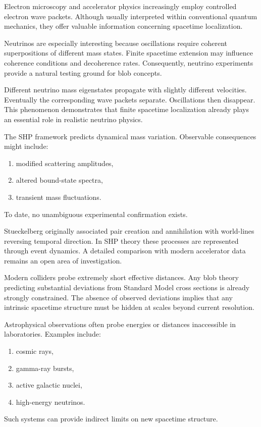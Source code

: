 Electron microscopy and accelerator physics increasingly employ controlled electron wave packets.
Although usually interpreted within conventional quantum mechanics, they
offer valuable information concerning spacetime localization.

Neutrinos are especially interesting because oscillations require coherent
superpositions of different mass states.
Finite spacetime extension may influence coherence conditions and 
decoherence rates.
Consequently, neutrino experiments provide a natural testing ground for
blob concepts.

Different neutrino mass eigenstates propagate with slightly different
velocities.
Eventually the corresponding wave packets separate.
Oscillations then disappear.
This phenomenon demonstrates that finite spacetime localization already 
plays an essential role in realistic neutrino physics.

The SHP framework predicts dynamical mass variation.
Observable consequences might include:
\begin{enumerate}
\item modified scattering amplitudes,
\item altered bound-state spectra,
\item transient mass fluctuations.
\end{enumerate}
To date, no unambiguous experimental confirmation exists.

Stueckelberg originally associated pair creation and annihilation with
world-lines reversing temporal direction.
In SHP theory these processes are represented through event dynamics.
A detailed comparison with modern accelerator data remains an open area of investigation.

Modern colliders probe extremely short effective distances.
Any blob theory predicting substantial deviations from Standard Model 
cross sections is already strongly constrained.
The absence of observed deviations implies that any intrinsic spacetime
structure must be hidden at scales beyond current resolution.

Astrophysical observations often probe energies or distances inaccessible 
in laboratories.
Examples include:
\begin{enumerate}
\item cosmic rays,
\item gamma-ray bursts,
\item active galactic nuclei,
\item high-energy neutrinos.
\end{enumerate}
Such systems can provide indirect limits on new spacetime structure.

